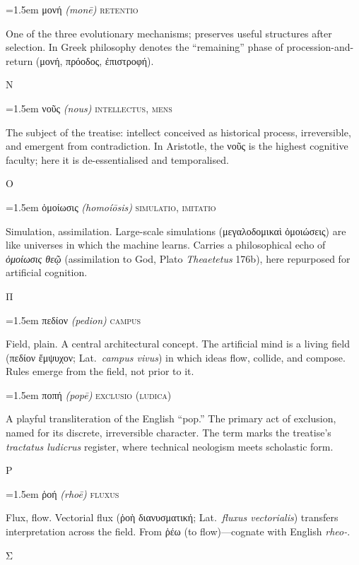 \documentclass[12pt, oneside, openany]{memoir}
\newcommand{\gk}[1]{\textgreek{#1}}
\newcommand{\gkblue}[1]{{\color{greekblue}\textgreek{#1}}}
\newcommand{\gentry}[4]{%
  \noindent\hangindent=1.5em
  {\gkblue{#1}}\enspace
  {\itshape(#2)}\enspace
  {\color{rubricate}\textperiodcentered}\enspace
  {\scshape #3}\par
  \hspace*{1.5em}%
  \parbox[t]{\dimexpr\linewidth-1.5em\relax}{\strut#4\strut}%
  \par\addvspace{6pt}}
\begin{document}
\gentry{μονή}{mon\={e}}{retentio}
{One of the three evolutionary mechanisms; preserves useful structures after selection. In Greek philosophy denotes the ``remaining'' phase of procession-and-return (\gk{μονή}, \gk{πρόοδος}, \gk{ἐπιστροφή}).}

\bigskip
{\centering\color{rubricate}\large\scshape Ν \par}\medskip

\gentry{νοῦς}{nous}{intellectus, mens}
{The subject of the treatise: intellect conceived as historical process, irreversible, and emergent from contradiction. In Aristotle, the \gk{νοῦς} is the highest cognitive faculty; here it is de-essentialised and temporalised.}

\bigskip
{\centering\color{rubricate}\large\scshape Ο \par}\medskip

\gentry{ὁμοίωσις}{homoí\={o}sis}{simulatio, imitatio}
{Simulation, assimilation. Large-scale simulations (\gk{μεγαλοδομικαὶ ὁμοιώσεις}) are like universes in which the machine learns. Carries a philosophical echo of \textit{ὁμοίωσις θεῷ} (assimilation to God, Plato \textit{Theaetetus} 176b), here repurposed for artificial cognition.}

\bigskip
{\centering\color{rubricate}\large\scshape Π \par}\medskip

\gentry{πεδίον}{pedion}{campus}
{Field, plain. A central architectural concept. The artificial mind is a living field (\gk{πεδίον ἔμψυχον}; Lat.\ \textit{campus vivus}) in which ideas flow, collide, and compose. Rules emerge from the field, not prior to it.}

\gentry{ποπή}{pop\={e}}{exclusio (ludica)}
{A playful transliteration of the English ``pop.'' The primary act of exclusion, named for its discrete, irreversible character. The term marks the treatise's \textit{tractatus ludicrus} register, where technical neologism meets scholastic form.}

\bigskip
{\centering\color{rubricate}\large\scshape Ρ \par}\medskip

\gentry{ῥοή}{rho\={e}}{fluxus}
{Flux, flow. Vectorial flux (\gk{ῥοὴ διανυσματική}; Lat.\ \textit{fluxus vectorialis}) transfers interpretation across the field. From \gk{ῥέω} (to flow)---cognate with English \textit{rheo-}.}

\bigskip
{\centering\color{rubricate}\large\scshape Σ \par}\medskip
\end{document}
